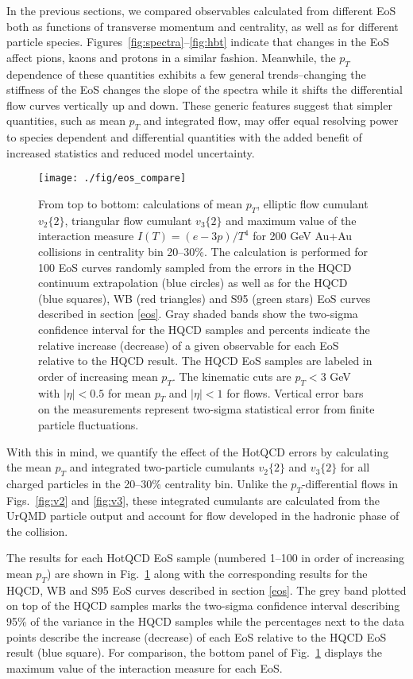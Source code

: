 \documentclass[aps,prc,reprint,amsmath,nofootinbib,superscriptaddress]{revtex4-1}
\begin{document}
In the previous sections, we compared observables calculated from different EoS both as functions of transverse momentum and centrality, as well as for different particle species. Figures~\ref{fig:spectra}--\ref{fig:hbt} indicate that changes in the EoS affect pions, kaons and protons in a similar fashion. Meanwhile, the $p_T$ dependence of these quantities exhibits a few general trends--changing the stiffness of the EoS changes the slope of the spectra while it shifts the differential flow curves vertically up and down. These generic features suggest that simpler quantities, such as mean $p_T$ and integrated flow, may offer equal resolving power to species dependent and differential quantities with the added benefit of increased statistics and reduced model uncertainty.

\begin{figure}
  \texttt{[image: ./fig/eos\_compare]}
  \caption{
    \label{fig:eos_compare}
    From top to bottom: calculations of mean $p_T$, elliptic flow cumulant $v_2\{2\}$, triangular flow cumulant $v_3\{2\}$ and maximum value of the interaction measure 
    $I(T) = (e - 3 p)/T^4$ for 200 GeV Au+Au collisions in centrality bin 20--30\%. The calculation is performed for 100 EoS curves randomly sampled from the errors in the HQCD 
    continuum extrapolation (blue circles) as well as for the  HQCD (blue squares), WB (red triangles) and S95 (green stars) EoS curves described in section \ref{eos}. 
    Gray shaded bands show the two-sigma confidence interval for the HQCD samples and percents indicate the relative increase (decrease) of a given observable for each EoS 
    relative to the HQCD result. The HQCD EoS samples are labeled in order of increasing mean $p_T$. The kinematic cuts are $p_T < 3$ GeV with $|\eta| < 0.5$ for mean $p_T$ 
    and $|\eta| < 1$ for flows. Vertical error bars on the measurements represent two-sigma statistical error from finite particle fluctuations.
  }
\end{figure}

With this in mind, we quantify the effect of the HotQCD errors by calculating the mean $p_T$ and integrated two-particle cumulants $v_2\{2\}$ and $v_3\{2\}$ for all charged particles in the 20--30\% centrality bin. Unlike the $p_T$-differential flows in Figs.~\ref{fig:v2} and \ref{fig:v3}, these integrated cumulants are calculated from the UrQMD particle output and account for flow developed in the hadronic phase of the collision. 

The results for each HotQCD EoS sample (numbered 1--100 in order of increasing mean $p_T$) are shown in Fig.~\ref{fig:eos_compare} along with the corresponding results for the HQCD, WB and S95 EoS curves described in section \ref{eos}. The grey band plotted on top of the HQCD samples marks the two-sigma confidence interval describing 95\% of the variance in the HQCD samples while the percentages next to the data points describe the increase (decrease) of each EoS relative to the HQCD EoS result (blue square). For comparison, the bottom panel of Fig.~\ref{fig:eos_compare} displays the maximum value of the interaction measure for each EoS.
\end{document}
